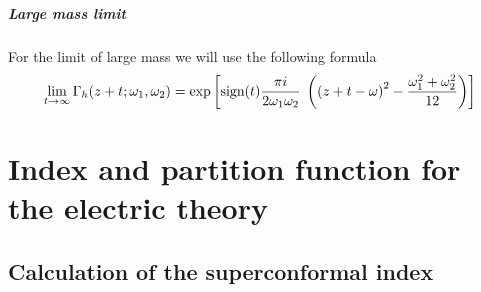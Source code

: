 \begin{appendices}
\paragraph{Large mass limit}
For the limit of large mass we will use the following formula \cite{vanDeBult:2007}
\begin{equation}
\begin{aligned}
 \lim_{ t \rightarrow \infty } \Gamma_h ( z + t; \omega_1, \omega_2) = 
\exp \left[ 
 \hbox{sign}(t) \frac{\pi i}{2 \omega_1 \omega_2}\; 
	\left(
		\left(
			z +t - \omega
		\right)^2 - \frac{\omega_1^2 + \omega_2^2}{12}
	\right)
\right]
\end{aligned}
\end{equation}






















\newpage

\chapter[Index and PF for the electric theory]{Index and 
partition function  for the electric theory}
\label{appendix:index_electric}
\section{Calculation of the superconformal index}

\end{appendices}
